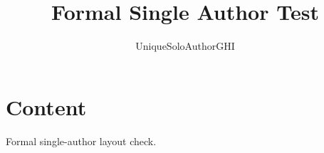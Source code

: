 \documentclass[titlepage=formal]{SUSTechHomework}
\title{Formal Single Author Test}
\author{UniqueSoloAuthorGHI}
\begin{document}
\maketitle
\section{Content}
Formal single-author layout check.
\end{document}
